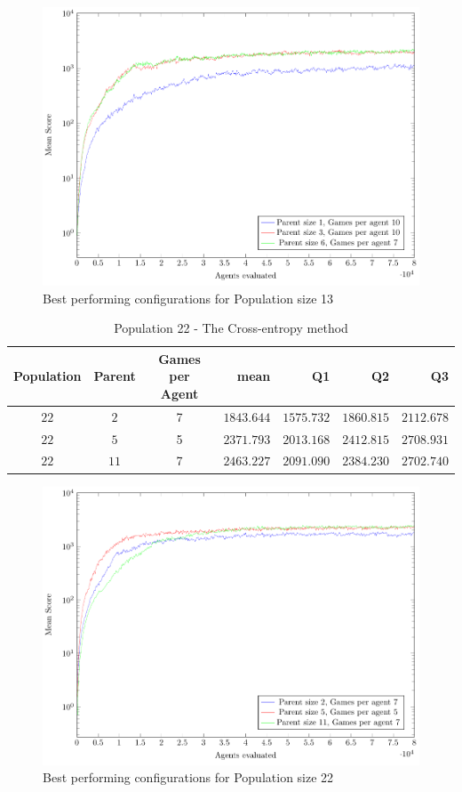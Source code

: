\begin{figure}[H]
\centering
\includegraphics[scale=1]{data/ce_population_offspring/bestofeach_population/13x/PlotFile.pdf}
\caption{Best performing configurations for Population size 13}
\end{figure}

\clearpage

\begin{table}[H]
\centering
\small
\begin{tabular}{c c c r r r r}
Population & Parent & Games per Agent & mean & Q1 & Q2 & Q3\\
\hline
$22$ & $2$ & 7 & $1843.644$ & $1575.732$ & $1860.815$ & $2112.678$\\
$22$ & $5$ & 5 & $2371.793$ & $2013.168$ & $2412.815$ & $2708.931$\\
$22$ & $11$ & 7 & $2463.227$ & $2091.090$ & $2384.230$ & $2702.740$\\
\end{tabular}
\caption{Population 22 - The Cross-entropy method}
\end{table}

\begin{figure}[H]
\centering
\includegraphics[scale=1]{data/ce_population_offspring/bestofeach_population/22x/PlotFile.pdf}
\caption{Best performing configurations for Population size 22}
\end{figure}

